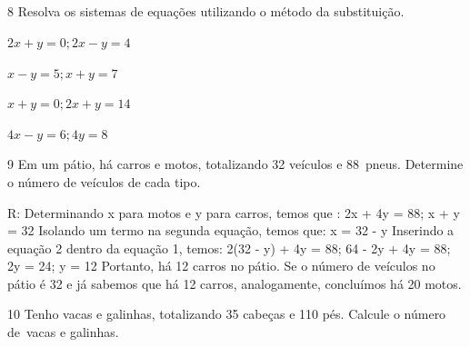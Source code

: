 \\
\\
\\
\\
\\
\\
\\
\\
\\

\num{8} Resolva os sistemas de equações utilizando o método da substituição.


\begin{escolha}
\item $2x + y = 0; 2x - y = 4$
\item $x - y = 5; x + y = 7$
\item $x + y = 0; 2x + y = 14$
\item $4x - y = 6; 4y = 8$
\end{escolha}


\num{9} Em um pátio, há carros e motos, totalizando 32 veículos e 88~pneus.
Determine o número de veículos de cada tipo.

R: Determinando x para motos e y para carros, temos que :
2x + 4y = 88; x + y = 32
Isolando um termo na segunda equação, temos que: x = 32 - y
Inserindo a equação 2 dentro da equação 1, temos:
2(32 - y) + 4y = 88; 64 - 2y + 4y = 88; 2y = 24; y = 12
Portanto, há 12 carros no pátio.
Se o número de veículos no pátio é 32 e já sabemos que há 12 carros,
analogamente, concluímos há 20 motos.

\pagebreak

\num{10} Tenho vacas e galinhas, totalizando 35 cabeças e 110 pés. Calcule o
número de~vacas e galinhas.

